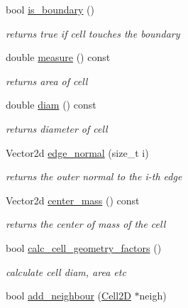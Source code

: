 \begin{DoxyCompactItemize}
bool \hyperlink{group__Mesh2D_ga18301893ef337b39e574b9436683a768}{is\+\_\+boundary} ()
\begin{DoxyCompactList}\small\item\em returns true if cell touches the boundary \end{DoxyCompactList}\item 
double \hyperlink{group__Mesh2D_ga8ccf935009cd076213ed94bd1d2aaef4}{measure} () const
\begin{DoxyCompactList}\small\item\em returns area of cell \end{DoxyCompactList}\item 
double \hyperlink{group__Mesh2D_ga5630bc9a4237f8d3afe7d77878dc5d47}{diam} () const
\begin{DoxyCompactList}\small\item\em returns diameter of cell \end{DoxyCompactList}\item 
\mbox{\label{classHCore2D_1_1Cell2D_a50635f2a486a9af7aa89d6af4dc17422}} 
Vector2d \hyperlink{classHCore2D_1_1Cell2D_a50635f2a486a9af7aa89d6af4dc17422}{edge\+\_\+normal} (size\+\_\+t i)
\begin{DoxyCompactList}\small\item\em returns the outer normal to the i-\/th edge \end{DoxyCompactList}\item 
Vector2d \hyperlink{group__Mesh2D_gaf01db402722eefa19732b50c583860cd}{center\+\_\+mass} () const
\begin{DoxyCompactList}\small\item\em returns the center of mass of the cell \end{DoxyCompactList}\item 
\mbox{\label{classHCore2D_1_1Cell2D_a5dd60b54738e447e922b8d4decfac5b2}} 
bool \hyperlink{classHCore2D_1_1Cell2D_a5dd60b54738e447e922b8d4decfac5b2}{calc\+\_\+cell\+\_\+geometry\+\_\+factors} ()
\begin{DoxyCompactList}\small\item\em calculate cell diam, area etc \end{DoxyCompactList}\item 
\mbox{\label{classHCore2D_1_1Cell2D_a292fc40f47362fd33ba6eeea8181b444}} 
bool \hyperlink{classHCore2D_1_1Cell2D_a292fc40f47362fd33ba6eeea8181b444}{add\+\_\+neighbour} (\hyperlink{classHCore2D_1_1Cell2D}{Cell2D} $\ast$neigh)

\end{DoxyCompactItemize}
